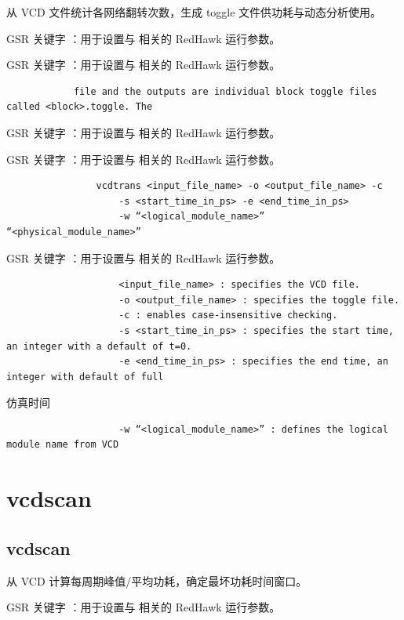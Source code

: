 从 VCD 文件统计各网络翻转次数，生成 toggle 文件供功耗与动态分析使用。

GSR 关键字 ：用于设置与  相关的 RedHawk 运行参数。

GSR 关键字 ：用于设置与  相关的 RedHawk 运行参数。

\begin{lstlisting}
            file and the outputs are individual block toggle files called <block>.toggle. The
\end{lstlisting}

GSR 关键字 ：用于设置与  相关的 RedHawk 运行参数。

GSR 关键字 ：用于设置与  相关的 RedHawk 运行参数。

\begin{lstlisting}
                vcdtrans <input_file_name> -o <output_file_name> -c
                    -s <start_time_in_ps> -e <end_time_in_ps>
                    -w “<logical_module_name>” “<physical_module_name>”
\end{lstlisting}

GSR 关键字 ：用于设置与  相关的 RedHawk 运行参数。

\begin{lstlisting}
                    <input_file_name> : specifies the VCD file.
                    -o <output_file_name> : specifies the toggle file.
                    -c : enables case-insensitive checking.
                    -s <start_time_in_ps> : specifies the start time, an integer with a default of t=0.
                    -e <end_time_in_ps> : specifies the end time, an integer with default of full
\end{lstlisting}

仿真时间

\begin{lstlisting}
                    -w “<logical_module_name>” : defines the logical module name from VCD
\end{lstlisting}

\section{vcdscan}
\subsection*{vcdscan}

从 VCD 计算每周期峰值/平均功耗，确定最坏功耗时间窗口。

GSR 关键字 ：用于设置与  相关的 RedHawk 运行参数。

